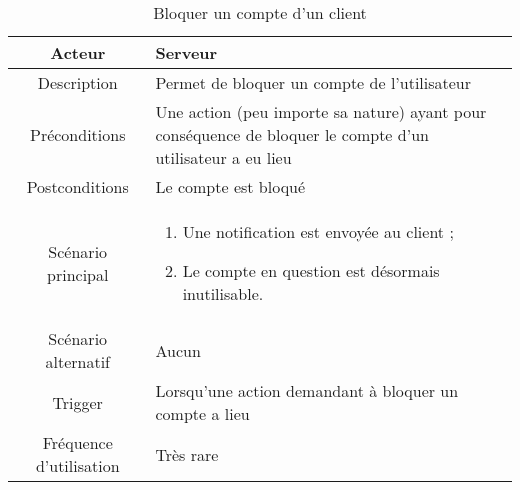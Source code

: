 \documentclass{article}
\begin{document}
\begin{table}

\begin{tabular}{|c|p{11cm}|}
\hline
Acteur & Serveur \\
\hline
Description & Permet de bloquer un compte de l'utilisateur \\
\hline
Préconditions & Une action (peu importe sa nature) ayant pour conséquence de bloquer le compte d'un utilisateur a eu lieu \\
\hline
Postconditions & Le compte est bloqué \\
\hline
Scénario principal & \begin{enumerate}
\item Une notification est envoyée au client ;
\item Le compte en question est désormais inutilisable.
\end{enumerate} \\
\hline
Scénario alternatif & Aucun \\
\hline
Trigger & Lorsqu'une action demandant à bloquer un compte a lieu \\
\hline
Fréquence d'utilisation & Très rare \\
\hline
\end{tabular}

\caption{Bloquer un compte d'un client}

\end{table}
\end{document}
